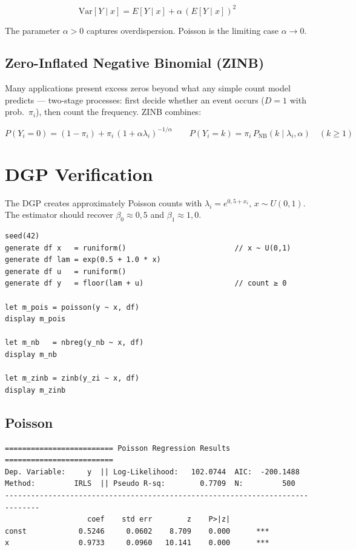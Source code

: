 \[
  \mathrm{Var}[Y \mid x] = E[Y\mid x] + \alpha\,(E[Y\mid x])^2
\]

The parameter $\alpha > 0$ captures overdispersion. Poisson is the limiting
case $\alpha \to 0$.

\subsection*{Zero-Inflated Negative Binomial (ZINB)}

Many applications present excess zeros beyond what any simple count model
predicts — two-stage processes: first decide whether an event occurs ($D=1$ with
prob.\ $\pi_i$), then count the frequency. ZINB combines:

\[
  P(Y_i = 0) = (1-\pi_i) + \pi_i\,(1+\alpha\lambda_i)^{-1/\alpha}
  \qquad
  P(Y_i = k) = \pi_i\,P_{\mathrm{NB}}(k \mid \lambda_i,\alpha)\quad (k\geq 1)
\]

\section{DGP Verification}

The DGP creates approximately Poisson counts with $\lambda_i = e^{0{,}5 + x_i}$,
$x \sim U(0,1)$. The estimator should recover $\beta_0 \approx 0{,}5$ and $\beta_1 \approx 1{,}0$.

\begin{lstlisting}[caption={Poisson, NegBin and ZINB}]
seed(42)
generate df x   = runiform()                         // x ~ U(0,1)
generate df lam = exp(0.5 + 1.0 * x)
generate df u   = runiform()
generate df y   = floor(lam + u)                     // count ≥ 0

let m_pois = poisson(y ~ x, df)
display m_pois

let m_nb   = nbreg(y_nb ~ x, df)
display m_nb

let m_zinb = zinb(y_zi ~ x, df)
display m_zinb
\end{lstlisting}

\subsection*{Poisson}

\begin{lstlisting}[language={}, basicstyle=\ttfamily\small,
  frame=none, numbers=none, backgroundcolor=\color{codbg},
  xleftmargin=0pt, xrightmargin=0pt, breaklines=false]
========================= Poisson Regression Results =========================
Dep. Variable:     y  || Log-Likelihood:   102.0744  AIC:  -200.1488
Method:         IRLS  || Pseudo R-sq:        0.7709  N:         500
------------------------------------------------------------------------------
                   coef    std err        z    P>|z|
const            0.5246     0.0602    8.709    0.000      ***
x                0.9733     0.0960   10.141    0.000      ***
\end{lstlisting}

